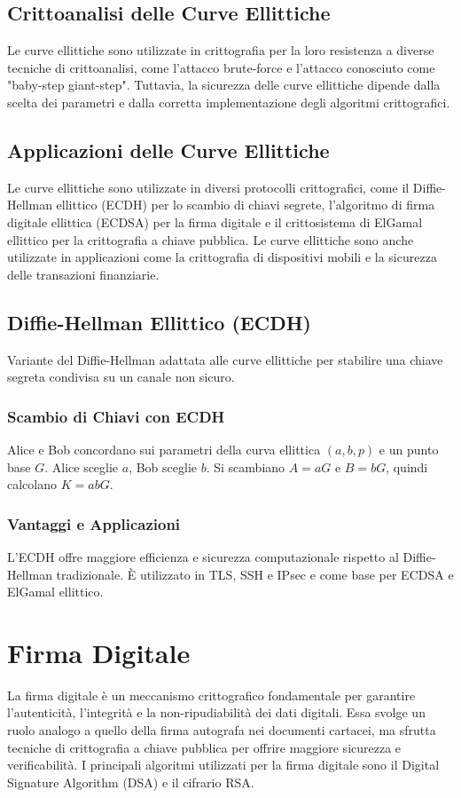\documentclass[a4paper,12pt]{report}
\begin{document}
\section{Crittoanalisi delle Curve Ellittiche}
Le curve ellittiche sono utilizzate in crittografia per la loro resistenza a diverse tecniche di crittoanalisi, come l'attacco brute-force e l'attacco conosciuto come "baby-step giant-step". Tuttavia, la sicurezza delle curve ellittiche dipende dalla scelta dei parametri e dalla corretta implementazione degli algoritmi crittografici.

\section{Applicazioni delle Curve Ellittiche}
Le curve ellittiche sono utilizzate in diversi protocolli crittografici, come il Diffie-Hellman ellittico (ECDH) per lo scambio di chiavi segrete, l'algoritmo di firma digitale ellittica (ECDSA) per la firma digitale e il crittosistema di ElGamal ellittico per la crittografia a chiave pubblica. Le curve ellittiche sono anche utilizzate in applicazioni come la crittografia di dispositivi mobili e la sicurezza delle transazioni finanziarie.

\section{Diffie-Hellman Ellittico (ECDH)}
Variante del Diffie-Hellman adattata alle curve ellittiche per stabilire una chiave segreta condivisa su un canale non sicuro.

\subsection*{Scambio di Chiavi con ECDH}
Alice e Bob concordano sui parametri della curva ellittica $(a, b, p)$ e un punto base $G$. Alice sceglie $a$, Bob sceglie $b$. Si scambiano $A = aG$ e $B = bG$, quindi calcolano $K = abG$.

\subsection*{Vantaggi e Applicazioni}
L'ECDH offre maggiore efficienza e sicurezza computazionale rispetto al Diffie-Hellman tradizionale. È utilizzato in TLS, SSH e IPsec e come base per ECDSA e ElGamal ellittico.

%
%
%
%
%
%
\chapter{Firma Digitale}
La firma digitale è un meccanismo crittografico fondamentale per garantire l'autenticità, l'integrità e la non-ripudiabilità dei dati digitali. Essa svolge un ruolo analogo a quello della firma autografa nei documenti cartacei, ma sfrutta tecniche di crittografia a chiave pubblica per offrire maggiore sicurezza e verificabilità. I principali algoritmi utilizzati per la firma digitale sono il Digital Signature Algorithm (DSA) e il cifrario RSA.
\end{document}
